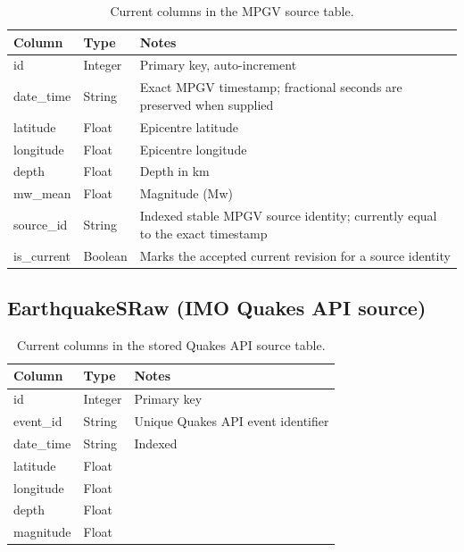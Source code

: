 \documentclass[12pt]{article}
\begin{document}
\begin{table}[H]
\centering
\caption{Current columns in the MPGV source table.}
\footnotesize
\setlength{\tabcolsep}{3pt}
\begin{tabular}{>{\raggedright\arraybackslash}p{3.1cm}>{\raggedright\arraybackslash}p{2.0cm}>{\raggedright\arraybackslash}p{8.6cm}}
\hline
\textbf{Column} & \textbf{Type} & \textbf{Notes} \\
\hline
id        & Integer & Primary key, auto-increment \\
date\_time & String  & Exact MPGV timestamp; fractional seconds are preserved when supplied \\
latitude  & Float   & Epicentre latitude \\
longitude & Float   & Epicentre longitude \\
depth     & Float   & Depth in km \\
mw\_mean  & Float   & Magnitude (Mw) \\
source\_id & String & Indexed stable MPGV source identity; currently equal to the exact timestamp \\
is\_current & Boolean & Marks the accepted current revision for a source identity \\
\hline
\end{tabular}
\end{table}

\subsection*{EarthquakeSRaw (IMO Quakes API source)}

\begin{table}[H]
\centering
\caption{Current columns in the stored Quakes API source table.}
\footnotesize
\setlength{\tabcolsep}{3pt}
\begin{tabular}{>{\raggedright\arraybackslash}p{3.1cm}>{\raggedright\arraybackslash}p{2.0cm}>{\raggedright\arraybackslash}p{8.6cm}}
\hline
\textbf{Column} & \textbf{Type} & \textbf{Notes} \\
\hline
id         & Integer & Primary key \\
event\_id  & String  & Unique Quakes API event identifier \\
date\_time & String  & Indexed \\
latitude   & Float   & \\
longitude  & Float   & \\
depth      & Float   & \\
magnitude  & Float   & \\
\hline
\end{tabular}
\end{table}
\end{document}
